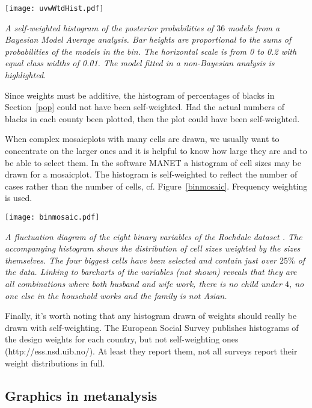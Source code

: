 \documentclass{svmult}
\begin{document}
\begin{center}
      \texttt{[image: uvwWtdHist.pdf]}
      \caption{\label{uvw}\em A self-weighted histogram of the posterior probabilities of $36$ models from a Bayesian Model Average analysis.  Bar heights are proportional to the sums of probabilities of the models in the bin.  The horizontal scale is from 0 to 0.2 with equal class widths of 0.01.   The model fitted in a non-Bayesian analysis is highlighted.}
      \end{center}
 
 
Since weights must be additive, the histogram of percentages of blacks in Section~\ref{pop} could not have been self-weighted.  Had the actual numbers of blacks in each county been plotted, then the plot could have been self-weighted.
   
      When complex mosaicplots with many cells are drawn, we usually want to concentrate on the larger ones and it is helpful to know how large they are and to be able to select them.  In the software MANET \citep{unwin:1996} a histogram of cell sizes may be drawn for a mosaicplot.  The histogram is self-weighted to reflect the number of cases rather than the number of cells, cf. Figure~\ref{binmosaic}. Frequency weighting is used.


\begin{center}
      \texttt{[image: binmosaic.pdf]}
      \caption{\label{binmosaic}\em A fluctuation diagram of the eight binary variables of the Rochdale dataset \citep{whittaker:1990}.   The accompanying histogram shows the distribution of cell sizes weighted by the sizes themselves.  The four biggest cells have been selected and contain just over $25\%$ of the data.  Linking to barcharts of the variables (not shown) reveals that they are all combinations where both husband and wife work, there is no child under $4$, no one else in the household works and the family is not Asian.}
      \end{center}

Finally, it's worth noting that any histogram drawn of weights should really be drawn with self-weighting.  The European Social Survey publishes histograms of the design weights for each country, but not self-weighting ones (http://ess.nsd.uib.no/).  At least they report them, not all surveys report their weight distributions in full.
\newpage
\subsection{Graphics in metanalysis}
\label{meta}
\end{document}
